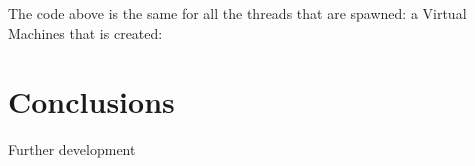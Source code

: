 \documentclass[a4paper,10pt]{article}
\begin{document}
\begin{multicols}{2}
The code above is the same for all the threads that are spawned: a Virtual Machines that is created: 

\section{Conclusions}

Further development


%


\end{multicols}
\end{document}
